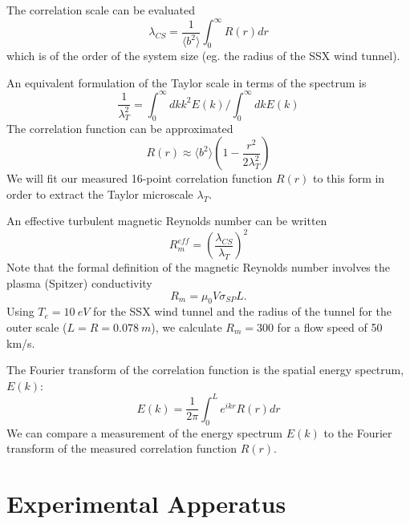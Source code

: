 \documentclass[aip,prl,amsmath,amssymb,reprint,superscriptaddress]{revtex4-1} %
\begin{document}
The correlation scale can be evaluated
%
\begin{equation}
\lambda_{CS}  = \frac{1}{\langle b^2 \rangle} \int_0^\infty R(r) dr
\label{eq:tayscale2}
\end{equation}
%
which is of the order of the system size (eg. the radius of the SSX wind tunnel).

An equivalent formulation of the Taylor scale in terms of the spectrum is
%
\begin{equation}
\frac{1}{\lambda_T^2}  = \int_0^\infty dk k^2 E(k)/\int_0^\infty dk E(k)
\label{eq:tayscale3}
\end{equation}
%
The correlation function can be approximated
\begin{equation}
R(r) \approx  \langle b^2 \rangle \left(1 - \frac{r^2}{2 \lambda_T^2}  \right)
\label{eq:correlation2}  
\end{equation}
%
We will fit our measured 16-point correlation function $R(r)$ to this form in order to extract the Taylor microscale $\lambda_T$. 

An effective turbulent magnetic Reynolds number can be written \cite{Batchelor70}
%
\begin{equation}
R_m^{eff}  = \left(\frac{\lambda_{CS}}{\lambda_T} \right)^2
\label{eq:magReynNum}
\end{equation}
%
Note that the formal definition of the magnetic Reynolds number involves the plasma (Spitzer) conductivity
\begin{equation}
R_m = \mu_0 V \sigma_{SP} L.
\label{eq:magReynNum2} 
\end{equation}
%
Using $T_e = 10~eV$ for the SSX wind tunnel and the radius of the tunnel for the outer scale ($L = R = 0.078~m$), we calculate $R_m = 300$ for a flow speed of 50 km/s.

The Fourier transform of the correlation function is the spatial energy spectrum, $E(k)$:
%
\begin{equation}
E(k) = \frac{1}{2 \pi} \int_0^L e^{ikr} R(r) dr
\label{eq:spectrum1}
\end{equation}
%
We can compare a measurement of the energy spectrum $E(k)$ to the Fourier transform of the measured correlation function $R(r)$.

\section{Experimental Apperatus}
\end{document}
